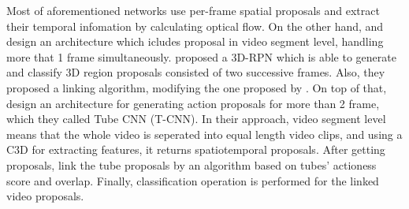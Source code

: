 Most of aforementioned networks use per-frame spatial proposals and extract their temporal infomation by calculating optical flow. On the other hand,  \cite{DBLP:journals/corr/SahaSC17} and  \cite{DBLP:journals/corr/HouCS17} design an architecture which icludes proposal in video segment level, handling more that 1 frame simultaneously. \cite{DBLP:journals/corr/SahaSC17} proposed a 3D-RPN which
is able to generate and classify 3D region proposals consisted of two successive frames. Also, they proposed a linking algorithm, modifying the one proposed by \cite{DBLP:journals/corr/SahaSSTC16}.
On top of that, \cite{DBLP:journals/corr/HouCS17} design an architecture for generating action proposals for more than 2 frame, which they called Tube CNN (T-CNN). In their approach, video segment level means that the whole video is seperated into equal length video clips, and
using a C3D for extracting features, it returns spatiotemporal proposals. After getting proposals, \cite{DBLP:journals/corr/HouCS17} link the tube proposals by an algorithm based on tubes'
actioness score and overlap. Finally, classification operation is performed for the linked video proposals.


% 